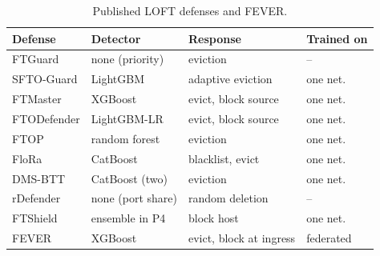 \documentclass[conference]{IEEEtran}
\begin{document}
\begin{table}[t]
\centering
\caption{Published LOFT defenses and FEVER.}
\label{tab:related}
\footnotesize
\setlength{\tabcolsep}{2.5pt}
\begin{tabular}{llll}
\toprule
Defense & Detector & Response & Trained on \\
\midrule
FTGuard \cite{zhang2017ftguard} & none (priority) & eviction & -- \\
SFTO-Guard \cite{tang2023sftoguard} & LightGBM & adaptive eviction & one net. \\
FTMaster \cite{tang2023ftmaster} & XGBoost & evict, block source & one net. \\
FTODefender \cite{tang2024ftodefender} & LightGBM-LR & evict, block source & one net. \\
FTOP \cite{tang2024ftop} & random forest & eviction & one net. \\
FloRa \cite{mudgal2024flora} & CatBoost & blacklist, evict & one net. \\
DMS-BTT \cite{tang2025dmsbtt} & CatBoost (two) & eviction & one net. \\
rDefender \cite{kong2024rdefender} & none (port share) & random deletion & -- \\
FTShield \cite{jain2025ftshield} & ensemble in P4 & block host & one net. \\
FEVER & XGBoost & evict, block at ingress & federated \\
\bottomrule
\end{tabular}
\end{table}
\end{document}

